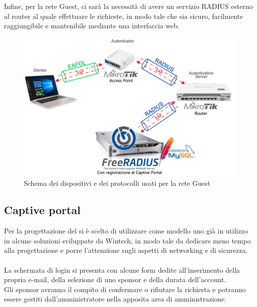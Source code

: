 \documentclass[Realizzazione.tex]{subfiles}
\begin{document}
Infine, per la rete Guest, ci sarà la necessità di avere un servizio RADIUS esterno al router al quale effettuare le richieste, in modo tale che sia sicuro, facilmente raggiungibile e mantenibile mediante una interfaccia web.
\begin{figure}[H]
	\centering
	\includegraphics[width=1.1\linewidth]{"images/Schema_tecnologie_RADIUS"}
	\caption{Schema dei dispositivi e dei protocolli usati per la rete Guest}
	\label{fig:Schema dei dispositivi e dei protocolli usati per la rete Guest}
\end{figure}

\subsection{Captive portal}
Per la progettazione del  si è scelto di utilizzare come modello uno già in utilizzo in alcune soluzioni sviluppate da Wintech, in modo tale da dedicare meno tempo alla progettazione e porre l'attenzione sugli aspetti di networking e di sicurezza. \\\\
La schermata di login si presenta con alcune form dedite all'inserimento della propria e-mail, della selezione di uno sponsor e della durata dell'account. \\
Gli sponsor avranno il compito di confermare o rifiutare la richiesta e potranno essere gestiti dall'amministratore nella apposita area di amministrazione. \\
\end{document}
